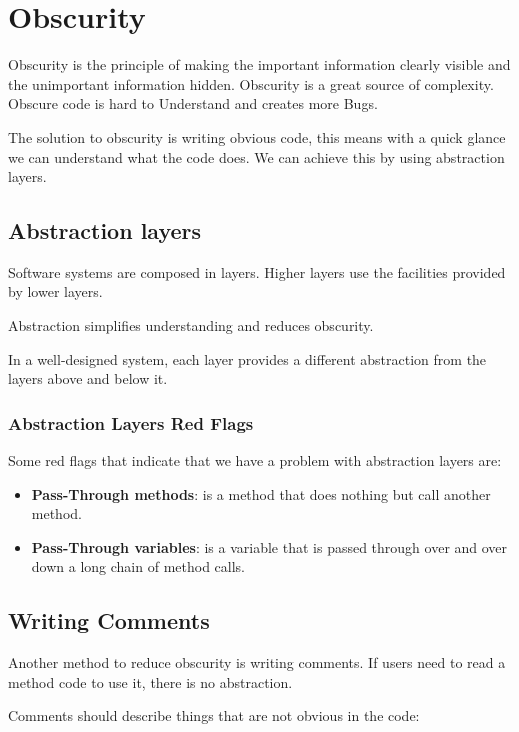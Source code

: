 \section{Obscurity}

Obscurity is the principle of making the important information clearly visible and the unimportant information hidden.
Obscurity is a great source of complexity. Obscure code is hard to Understand and creates more Bugs.

The solution to obscurity is writing obvious code, this means with a quick glance we can understand what the code does.
We can achieve this by using abstraction layers.


\subsection{Abstraction layers}

Software systems are composed in layers. Higher layers use the facilities provided by lower layers.

Abstraction simplifies understanding and reduces obscurity.

In a well-designed system, each layer provides a different abstraction from the layers above and below it.


\subsubsection{Abstraction Layers Red Flags}

Some red flags that indicate that we have a problem with abstraction layers are:

\begin{itemize}
  \item \textbf{Pass-Through methods}: is a method that does nothing but call another method.
  \item \textbf{Pass-Through variables}: is a variable that is passed through over and over down a long chain of method calls.
\end{itemize}

\subsection{Writing Comments}

Another method to reduce obscurity is writing comments. If users need to read a method code to use it, there is no
abstraction.

Comments should describe things that are not obvious in
the code:

